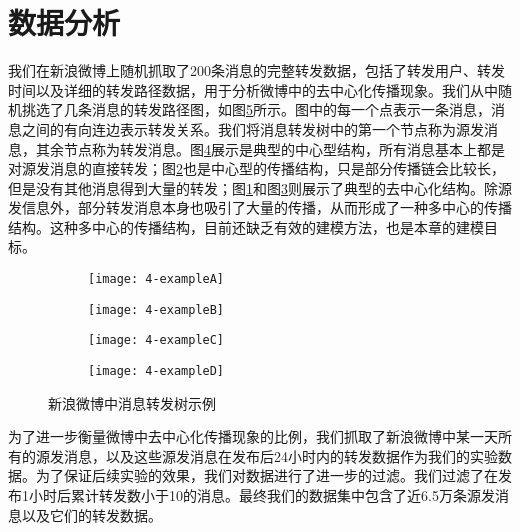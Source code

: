 \section{数据分析}
我们在新浪微博上随机抓取了200条消息的完整转发数据，包括了转发用户、转发时间以及详细的转发路径数据，用于分析微博中的去中心化传播现象。我们从中随机挑选了几条消息的转发路径图，如图\ref{fig:diffusionTree}所示。图中的每一个点表示一条消息，消息之间的有向连边表示转发关系。我们将消息转发树中的第一个节点称为源发消息，其余节点称为转发消息。图\ref{fig:exampleD}展示是典型的中心型结构，所有消息基本上都是对源发消息的直接转发；图\ref{fig:exampleB}也是中心型的传播结构，只是部分传播链会比较长，但是没有其他消息得到大量的转发；图\ref{fig:exampleA}和图\ref{fig:exampleC}则展示了典型的去中心化结构。除源发信息外，部分转发消息本身也吸引了大量的传播，从而形成了一种多中心的传播结构。这种多中心的传播结构，目前还缺乏有效的建模方法，也是本章的建模目标。
\begin{figure}[!htb]
  \centering
  \begin{subfigure}[b]{0.4\textwidth}
    \texttt{[image: 4-exampleA]}
    \caption{}
    \label{fig:exampleA}
  \end{subfigure}%
  \hspace{0.05\textwidth}
  \begin{subfigure}[b]{0.4\textwidth}
    \texttt{[image: 4-exampleB]}
    \caption{}
    \label{fig:exampleB}
  \end{subfigure}
  \begin{subfigure}[b]{0.4\textwidth}
    \texttt{[image: 4-exampleC]}
    \caption{}
    \label{fig:exampleC}
  \end{subfigure}%
  \hspace{0.05\textwidth}
  \begin{subfigure}[b]{0.4\textwidth}
    \texttt{[image: 4-exampleD]}
    \caption{}
    \label{fig:exampleD}
  \end{subfigure}
  \caption{新浪微博中消息转发树示例}
  \label{fig:diffusionTree}
\end{figure}

为了进一步衡量微博中去中心化传播现象的比例，我们抓取了新浪微博中某一天所有的源发消息，以及这些源发消息在发布后24小时内的转发数据作为我们的实验数据。为了保证后续实验的效果，我们对数据进行了进一步的过滤。我们过滤了在发布1小时后累计转发数小于10的消息。最终我们的数据集中包含了近6.5万条源发消息以及它们的转发数据。

